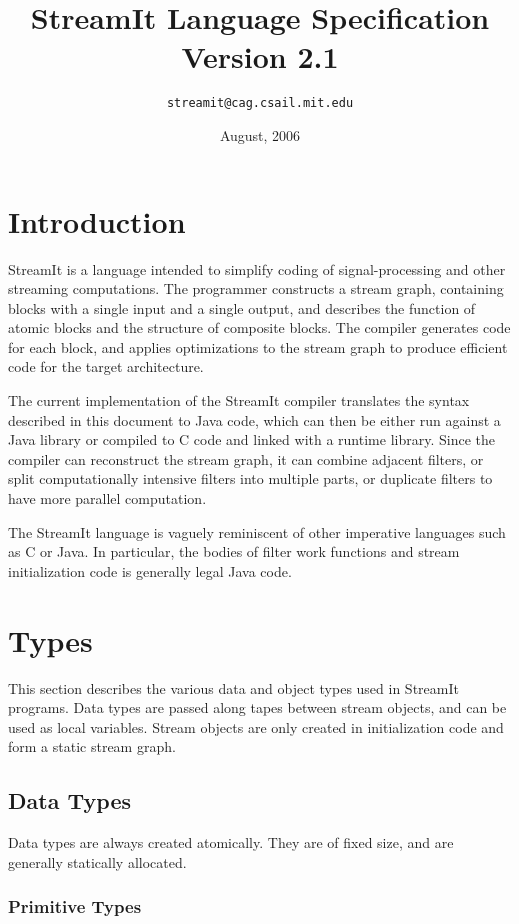 \documentclass[11pt]{article}
\title{StreamIt Language Specification\\
Version 2.1}
\author{\texttt{streamit@cag.csail.mit.edu}}
\date{August, 2006}
\begin{document}
\maketitle
\tableofcontents

\section{Introduction}

StreamIt is a language intended to simplify coding of
signal-processing and other streaming computations.  The programmer
constructs a stream graph, containing blocks with a single input and a
single output, and describes the function of atomic blocks and the
structure of composite blocks.  The compiler generates code for each
block, and applies optimizations to the stream graph to produce
efficient code for the target architecture.

The current implementation of the StreamIt compiler translates the
syntax described in this document to Java code, which can then be
either run against a Java library or compiled to C code and linked
with a runtime library.  Since the compiler can reconstruct the stream
graph, it can combine adjacent filters, or split computationally
intensive filters into multiple parts, or duplicate filters to have
more parallel computation.

The StreamIt language is vaguely reminiscent of other imperative
languages such as C or Java.  In particular, the bodies of filter work
functions and stream initialization code is generally legal Java
code.

\section{Types}

This section describes the various data and object types used in
StreamIt programs.  Data types are passed along tapes between stream
objects, and can be used as local variables.  Stream objects are only
created in initialization code and form a static stream graph.

\subsection{Data Types}

Data types are always created atomically.  They are of fixed size, and
are generally statically allocated.

\subsubsection{Primitive Types}
\label{sec:primitive-types}
\end{document}
